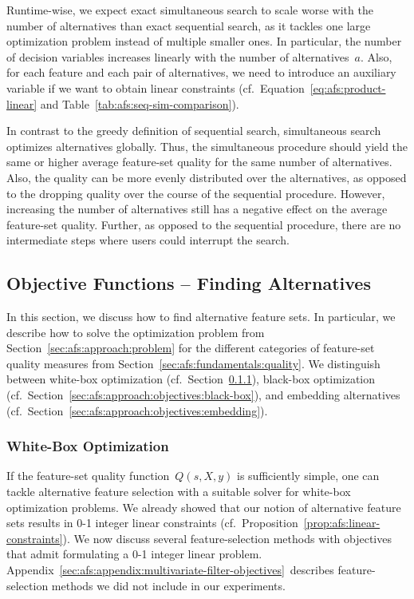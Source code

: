 \documentclass{article}
\theoremstyle{definition}
\begin{document}
Runtime-wise, we expect exact simultaneous search to scale worse with the number of alternatives than exact sequential search, as it tackles one large optimization problem instead of multiple smaller ones.
In particular, the number of decision variables increases linearly with the number of alternatives~$a$.
Also, for each feature and each pair of alternatives, we need to introduce an auxiliary variable if we want to obtain linear constraints (cf.~Equation~\ref{eq:afs:product-linear} and Table~\ref{tab:afs:seq-sim-comparison}).

In contrast to the greedy definition of sequential search, simultaneous search optimizes alternatives globally.
Thus, the simultaneous procedure should yield the same or higher average feature-set quality for the same number of alternatives.
Also, the quality can be more evenly distributed over the alternatives, as opposed to the dropping quality over the course of the sequential procedure.
However, increasing the number of alternatives still has a negative effect on the average feature-set quality.
Further, as opposed to the sequential procedure, there are no intermediate steps where users could interrupt the search.

\subsection{Objective Functions -- Finding Alternatives}
\label{sec:afs:approach:objectives}

In this section, we discuss how to find alternative feature sets.
In particular, we describe how to solve the optimization problem from Section~\ref{sec:afs:approach:problem} for the different categories of feature-set quality measures from Section~\ref{sec:afs:fundamentals:quality}.
We distinguish between white-box optimization (cf.~Section~\ref{sec:afs:approach:objectives:white-box}), black-box optimization (cf.~Section~\ref{sec:afs:approach:objectives:black-box}), and embedding alternatives (cf.~Section~\ref{sec:afs:approach:objectives:embedding}).

\subsubsection{White-Box Optimization}
\label{sec:afs:approach:objectives:white-box}

If the feature-set quality function~$Q(s,X,y)$ is sufficiently simple, one can tackle alternative feature selection with a suitable solver for white-box optimization problems.
We already showed that our notion of alternative feature sets results in 0-1 integer linear constraints (cf.~Proposition~\ref{prop:afs:linear-constraints}).
We now discuss several feature-selection methods with objectives that admit formulating a 0-1 integer linear problem.
Appendix~\ref{sec:afs:appendix:multivariate-filter-objectives}~describes feature-selection methods we did not include in our experiments.
\end{document}

